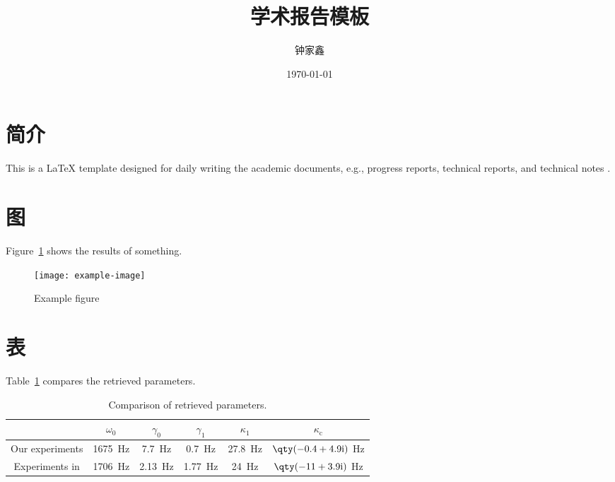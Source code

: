 \documentclass{article}
\title{\textbf{学术报告模板}}
\author{钟家鑫}
\date{\today}
\begin{document}
\maketitle
\thispagestyle{firststyle}

\section{简介}
This is a \LaTeX{} template designed for daily writing the academic documents, e.g., progress reports, technical reports, and technical notes \cite{Zhong2023ModalExpansionMethod}.

\lipsum[1]

\lipsum[2]

\lipsum[3]

\lipsum[4]

\lipsum[5]

\lipsum[6]

\section{图}
Figure~\ref{fig:39:f020390} shows the results of something.
\begin{figure}[!htb]
    \centering
    \texttt{[image: example-image]}
    \caption{Example figure}
    \label{fig:39:f020390}
\end{figure}

\section{表}
Table~\ref{tab:f20} compares the retrieved parameters.
\begin{table}[!htb]
    \centering
    \caption{Comparison of retrieved parameters.}
    \begin{tabular}{cccccc}
        \toprule
         & $\omega_0$ 
         & $\gamma_0$
         & $\gamma_1$
         & $\kappa_1$
         & $\kappa_\mathrm{c}$
         \\
        \midrule
        Our experiments 
         & 
         1675~Hz
         &
         7.7~Hz
         & 
         0.7~Hz
         &
         27.8~Hz
         & 
         $\qty(-0.4+4.9\mathrm{i})$ Hz\\
         Experiments in \cite{Zhang2021AcousticNonHermitianSkin}
         & 
         1706~Hz
         &
         2.13~Hz
         & 
         1.77~Hz
         &
         24~Hz
         & 
         $\qty(-11+3.9\mathrm{i})$ Hz\\
        \bottomrule
    \end{tabular}
    \label{tab:f20}
\end{table}
\end{document}
